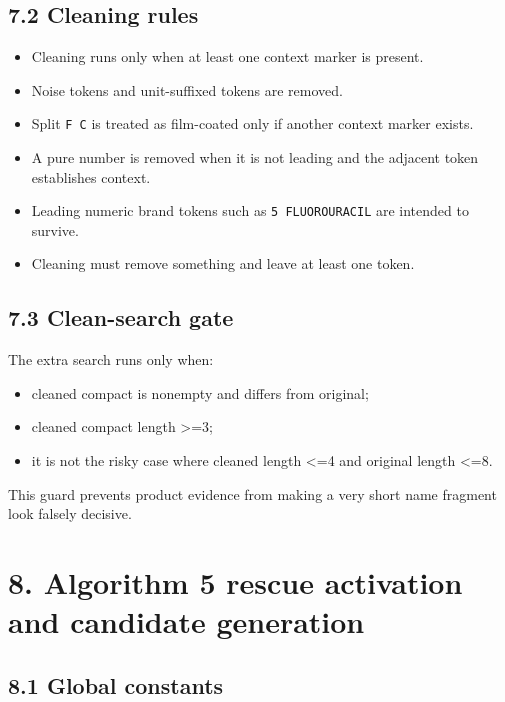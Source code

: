 \subsection{7.2 Cleaning rules}\label{72-cleaning-rules}

\begin{itemize}
\tightlist
\item
  Cleaning runs only when at least one context marker is present.
\item
  Noise tokens and unit-suffixed tokens are removed.
\item
  Split \texttt{F\ C} is treated as film-coated only if another context marker exists.
\item
  A pure number is removed when it is not leading and the adjacent token establishes context.
\item
  Leading numeric brand tokens such as \texttt{5\ FLUOROURACIL} are intended to survive.
\item
  Cleaning must remove something and leave at least one token.
\end{itemize}

\subsection{7.3 Clean-search gate}\label{73-clean-search-gate}

The extra search runs only when:

\begin{itemize}
\tightlist
\item
  cleaned compact is nonempty and differs from original;
\item
  cleaned compact length \textgreater=3;
\item
  it is not the risky case where cleaned length \textless=4 and original length \textless=8.
\end{itemize}

This guard prevents product evidence from making a very short name fragment look falsely decisive.

\section{8. Algorithm 5 rescue activation and candidate generation}\label{8-algorithm-5-rescue-activation-and-candidate-generation}

\subsection{8.1 Global constants}\label{81-global-constants}

